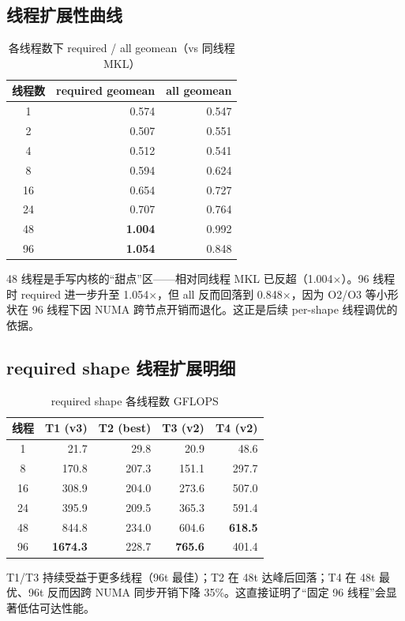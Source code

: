 \documentclass[11pt,a4paper,fontset=fandol]{ctexart}
\begin{document}
\subsection{线程扩展性曲线}
\begin{table}[H]
\centering
\caption{各线程数下 required / all geomean（vs 同线程 MKL）}
\small
\begin{tabular}{crr}
\toprule
线程数 & required geomean & all geomean \\
\midrule
1 & 0.574 & 0.547 \\
2 & 0.507 & 0.551 \\
4 & 0.512 & 0.541 \\
8 & 0.594 & 0.624 \\
16 & 0.654 & 0.727 \\
24 & 0.707 & 0.764 \\
48 & \textbf{1.004} & 0.992 \\
96 & \textbf{1.054} & 0.848 \\
\bottomrule
\end{tabular}
\end{table}
48 线程是手写内核的“甜点”区——相对同线程 MKL 已反超（1.004$\times$）。96 线程时 required 进一步升至 1.054$\times$，但 all 反而回落到 0.848$\times$，因为 O2/O3 等小形状在 96 线程下因 NUMA 跨节点开销而退化。这正是后续 per-shape 线程调优的依据。

\subsection{required shape 线程扩展明细}
\begin{table}[H]
\centering
\caption{required shape 各线程数 GFLOPS}
\small
\begin{tabular}{crrrr}
\toprule
线程 & T1 (v3) & T2 (best) & T3 (v2) & T4 (v2) \\
\midrule
1 & 21.7 & 29.8 & 20.9 & 48.6 \\
8 & 170.8 & 207.3 & 151.1 & 297.7 \\
16 & 308.9 & 204.0 & 273.6 & 507.0 \\
24 & 395.9 & 209.5 & 365.3 & 591.4 \\
48 & 844.8 & 234.0 & 604.6 & \textbf{618.5} \\
96 & \textbf{1674.3} & 228.7 & \textbf{765.6} & 401.4 \\
\bottomrule
\end{tabular}
\end{table}
T1/T3 持续受益于更多线程（96t 最佳）；T2 在 48t 达峰后回落；T4 在 48t 最优、96t 反而因跨 NUMA 同步开销下降 35\%。这直接证明了“固定 96 线程”会显著低估可达性能。
\end{document}
